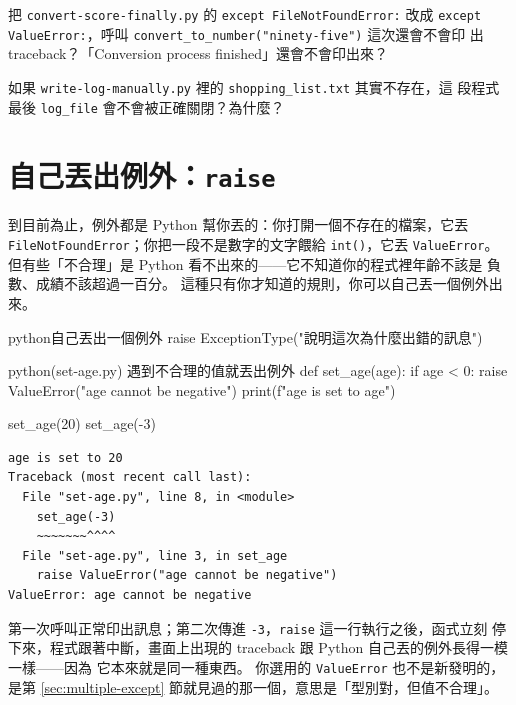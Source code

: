 
\begin{drills}[label=drills:finally]
\item 把 \texttt{convert-score-finally.py} 的 \texttt{except FileNotFoundError:} 改成
\texttt{except ValueError:}，呼叫 \texttt{convert\_to\_number("ninety-five")} 這次還會不會印
出 traceback？「Conversion process finished」還會不會印出來？
\item 如果 \texttt{write-log-manually.py} 裡的 \texttt{shopping\_list.txt} 其實不存在，這
段程式最後 \texttt{log\_file} 會不會被正確關閉？為什麼？
\end{drills}

\section{自己丟出例外：\texttt{raise}}
\label{sec:raise}

到目前為止，例外都是 Python 幫你丟的：你打開一個不存在的檔案，它丟
\texttt{FileNotFoundError}；你把一段不是數字的文字餵給 \texttt{int()}，它丟
\texttt{ValueError}。但有些「不合理」是 Python 看不出來的——它不知道你的程式裡年齡不該是
負數、成績不該超過一百分。 這種只有你才知道的規則，你可以自己丟一個例外出來。

\begin{code}{python}{自己丟出一個例外}
raise ExceptionType("說明這次為什麼出錯的訊息")
\end{code}

\begin{example}{python}{(set-age.py) 遇到不合理的值就丟出例外}
def set_age(age):
    if age < 0:
        raise ValueError("age cannot be negative")
    print(f"age is set to {age}")


set_age(20)
set_age(-3)
\end{example}

\begin{verbatim}
age is set to 20
Traceback (most recent call last):
  File "set-age.py", line 8, in <module>
    set_age(-3)
    ~~~~~~~^^^^
  File "set-age.py", line 3, in set_age
    raise ValueError("age cannot be negative")
ValueError: age cannot be negative
\end{verbatim}

第一次呼叫正常印出訊息；第二次傳進 \texttt{-3}，\texttt{raise} 這一行執行之後，函式立刻
停下來，程式跟著中斷，畫面上出現的 traceback 跟 Python 自己丟的例外長得一模一樣——因為
它本來就是同一種東西。 你選用的 \texttt{ValueError} 也不是新發明的，是第
\ref{sec:multiple-except} 節就見過的那一個，意思是「型別對，但值不合理」。

